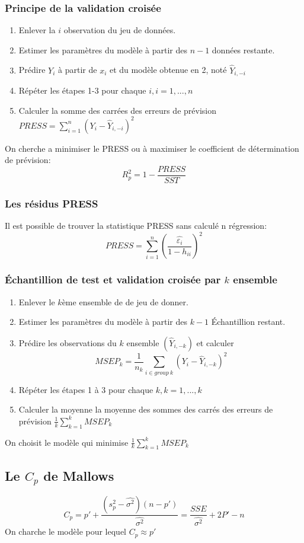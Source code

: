 \documentclass[10pt, french]{article}
\begin{document}
\begin{multicols*}{3}
\subsubsection*{Principe de la validation croisée}
\begin{enumerate}
		\item Enlever la $i$ observation du jeu de données.
		\item Estimer les paramètres du modèle à partir des $n - 1$ données restante.
		\item Prédire $Y_i$ à partir de $x_i$ et du modèle obtenue en 2, noté $\hat{Y}_{i,-i}$
		\item Répéter les étapes 1-3 pour chaque $i, i = 1,..., n$
		\item Calculer la somme des carrées des erreurs de prévision $PRESS = \sum_{i=1}^n (Y_i - \hat{Y}_{i,-i})^2$
\end{enumerate}
	On cherche a minimiser le PRESS ou à maximiser le coefficient de détermination de prévision:
	\[ R_p^2 = 1 - \frac{PRESS}{SST} \]
\subsubsection*{Les résidus PRESS}
	Il est possible de trouver la statistique PRESS sans calculé n régression:
	\[ PRESS = \sum_{i=1}^n \left( \frac{\hat{\varepsilon_i}}{1 - h_{ii}} \right)^2 \]
\subsubsection*{Échantillion de test et validation croisée par $k$ ensemble}
	\begin{enumerate}
		\item Enlever le $k$ème ensemble de de jeu de donner.
		\item Estimer les paramètres du modèle à partir des $k - 1$ Échantillion restant.
		\item Prédire les observations du $k$ ensemble $(\hat{Y}_{i,-k})$ et calculer 
		\[ MSEP_k = \frac{1}{n_k} \sum_{i\in group\:k} (Y_i - \hat{Y}_{i,-k})^2 \]
		\item Répéter les étapes 1 à 3 pour chaque $k, k = 1,...,k$
		\item Calculer la moyenne la moyenne des sommes des carrés des erreurs de prévision $\frac{1}{k} \sum_{k=1}^k MSEP_k$
	\end{enumerate}
	On choisit le modèle qui minimise $\frac{1}{k} \sum_{k=1}^k MSEP_k$


\subsection*{Le $C_p$ de Mallows}
\[ C_p = p' + \frac{(s_p^2 - \hat{\sigma^2})(n - p')}{\hat{\sigma^2}} = \frac{SSE}{\hat{\sigma^2}} + 2P' - n\]
On charche le modèle pour lequel $C_p \approx p'$


\end{multicols*}
\end{document}
